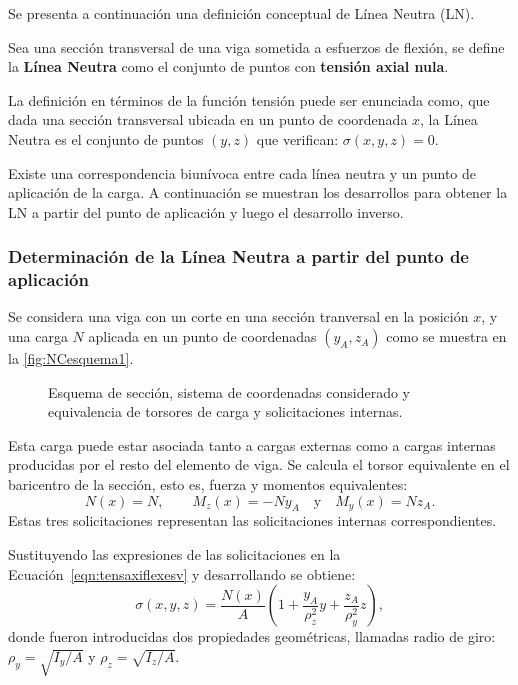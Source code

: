 Se presenta a continuación una definición conceptual de Línea Neutra (LN).

{Sea una sección transversal de una viga sometida a esfuerzos de flexión, se define la \textbf{Línea Neutra} como el conjunto de puntos con \textbf{tensión axial nula}.}

La definición en términos de la función tensión puede ser enunciada como, que dada una sección transversal ubicada en un punto de coordenada $x$, la Línea Neutra es el conjunto de puntos $(y,z)$ que verifican: $\sigma(x,y,z) = 0$.

Existe una correspondencia biunívoca entre cada línea neutra y un punto de aplicación de la carga. %
%
A continuación se muestran los desarrollos para obtener la LN a partir del punto de aplicación y luego el desarrollo inverso.

\subsubsection{Determinación de la Línea Neutra a partir del punto de aplicación}


Se considera una viga con un corte en una sección tranversal en la posición $x$, y una carga $N$ aplicada en un punto de coordenadas $(y_A,z_A)$ como se muestra en la \autoref{fig:NCesquema1}. %

\begin{figure}[htb]
	\centering
   \def\svgwidth{0.9\textwidth}
   
	\caption{Esquema de sección, sistema de coordenadas considerado y equivalencia de torsores de carga y solicitaciones internas.}
	\label{fig:NCesquema1}
\end{figure}

Esta carga puede estar asociada tanto a cargas externas como a cargas internas producidas por el resto del elemento de viga. %
%
Se calcula el torsor equivalente en el baricentro de la sección, esto es, fuerza y momentos equivalentes:
%
\begin{equation}
N(x) = N, \qquad  M_z(x) = -N y_A \quad  \text{y} \quad M_y(x) = N z_A.
\end{equation}
%
Estas tres solicitaciones representan las solicitaciones internas correspondientes.


Sustituyendo las expresiones de las solicitaciones en la Ecuación~\eqref{eqn:tensaxiflexesv} y desarrollando se obtiene:
%
\begin{equation}
\sigma(x,y,z) = \frac{N(x)}{A}
\left(1 +  \frac{ y_A}{\rho_z^2} y +  \frac{ z_A}{\rho_y^2} z \right),
\end{equation}
%
donde fueron introducidas dos propiedades geométricas, llamadas radio de giro: $\rho_y = \sqrt{ I_y / A}$ y $\rho_z = \sqrt{ I_z / A}$. %
%

